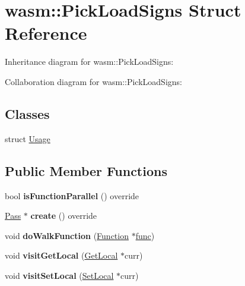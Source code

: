 \hypertarget{structwasm_1_1_pick_load_signs}{}\section{wasm\+:\+:Pick\+Load\+Signs Struct Reference}
\label{structwasm_1_1_pick_load_signs}


Inheritance diagram for wasm\+:\+:Pick\+Load\+Signs\+:


Collaboration diagram for wasm\+:\+:Pick\+Load\+Signs\+:
\subsection*{Classes}
\begin{DoxyCompactItemize}
\item 
struct \mbox{\hyperlink{structwasm_1_1_pick_load_signs_1_1_usage}{Usage}}
\end{DoxyCompactItemize}
\subsection*{Public Member Functions}
\begin{DoxyCompactItemize}
\item 
\mbox{\label{structwasm_1_1_pick_load_signs_a7854368a82cc2779bc173017ab21dd43}} 
bool {\bfseries is\+Function\+Parallel} () override
\item 
\mbox{\label{structwasm_1_1_pick_load_signs_a8b47b7e1f6e6e88084ad659f2623150a}} 
\mbox{\hyperlink{classwasm_1_1_pass}{Pass}} $\ast$ {\bfseries create} () override
\item 
\mbox{\label{structwasm_1_1_pick_load_signs_a291b115d35b35b25e90e96147f87f775}} 
void {\bfseries do\+Walk\+Function} (\mbox{\hyperlink{classwasm_1_1_function}{Function}} $\ast$\mbox{\hyperlink{structfunc}{func}})
\item 
\mbox{\label{structwasm_1_1_pick_load_signs_aae5669ecfd88a34276f16bb8444bd916}} 
void {\bfseries visit\+Get\+Local} (\mbox{\hyperlink{classwasm_1_1_get_local}{Get\+Local}} $\ast$curr)
\item 
\mbox{\label{structwasm_1_1_pick_load_signs_a188c9c9db48c6c7fd5994a124aad13e1}} 
void {\bfseries visit\+Set\+Local} (\mbox{\hyperlink{classwasm_1_1_set_local}{Set\+Local}} $\ast$curr)
\end{DoxyCompactItemize}
